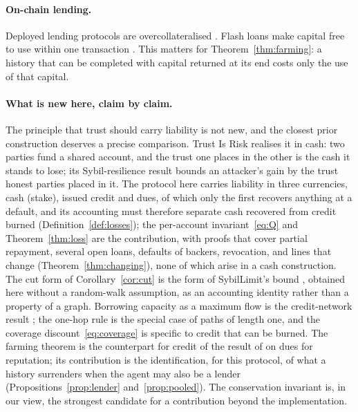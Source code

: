 \documentclass[acmsmall,nonacm,screen]{acmart}
\theoremstyle{acmdefinition}%
\begin{document}
\paragraph{On-chain lending.} Deployed lending protocols are overcollateralised
\citep{leshner2019compound,aave2020}. Flash loans make capital free to use within one transaction
\citep{qin2021flash}. This matters for Theorem~\ref{thm:farming}: a history that can be completed
with capital returned at its end costs only the use of that capital.

\paragraph{What is new here, claim by claim.} The principle that trust should carry liability is
not new, and the closest prior construction deserves a precise comparison. Trust Is Risk
\citep{litos2017trust} realises it in cash: two parties fund a shared account, and the trust one
places in the other is the cash it stands to lose; its Sybil-resilience result bounds an attacker's
gain by the trust honest parties placed in it. The protocol here carries liability in three
currencies, cash (stake), issued credit and dues, of which only the first recovers anything at a
default, and its accounting must therefore separate cash recovered from credit burned
(Definition~\ref{def:losses}); the per-account invariant~\eqref{eq:Q} and Theorem~\ref{thm:loss} are
the contribution, with proofs that cover partial repayment, several open loans, defaults of backers,
revocation, and lines that change (Theorem~\ref{thm:changing}), none of which arise in a cash
construction. The cut form of Corollary~\ref{cor:cut} is the form of SybilLimit's bound
\citep{yu2008sybillimit}, obtained here without a random-walk assumption, as an accounting identity
rather than a property of a graph. Borrowing capacity as a maximum flow is the credit-network result
\citep{dandekar2011liquidity}; the one-hop rule is the special case of paths of length one, and the
coverage discount~\eqref{eq:coverage} is specific to credit that can be burned. The farming theorem
is the counterpart for credit of the result of \citet{friedman2001cheap} on dues for reputation; its
contribution is the identification, for this protocol, of what a history surrenders when the agent
may also be a lender (Propositions~\ref{prop:lender} and~\ref{prop:pooled}). The conservation
invariant is, in our view, the strongest candidate for a contribution beyond the implementation.

\end{document}
